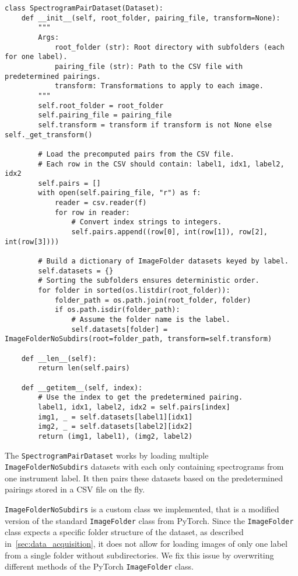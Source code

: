 \begin{lstlisting}[caption={Paired Dataset for Style Transfer}]
class SpectrogramPairDataset(Dataset):
    def __init__(self, root_folder, pairing_file, transform=None):
        """
        Args:
            root_folder (str): Root directory with subfolders (each for one label).
            pairing_file (str): Path to the CSV file with predetermined pairings.
            transform: Transformations to apply to each image.
        """
        self.root_folder = root_folder
        self.pairing_file = pairing_file
        self.transform = transform if transform is not None else self._get_transform()

        # Load the precomputed pairs from the CSV file.
        # Each row in the CSV should contain: label1, idx1, label2, idx2
        self.pairs = []
        with open(self.pairing_file, "r") as f:
            reader = csv.reader(f)
            for row in reader:
                # Convert index strings to integers.
                self.pairs.append((row[0], int(row[1]), row[2], int(row[3])))

        # Build a dictionary of ImageFolder datasets keyed by label.
        self.datasets = {}
        # Sorting the subfolders ensures deterministic order.
        for folder in sorted(os.listdir(root_folder)):
            folder_path = os.path.join(root_folder, folder)
            if os.path.isdir(folder_path):
                # Assume the folder name is the label.
                self.datasets[folder] = ImageFolderNoSubdirs(root=folder_path, transform=self.transform)

    def __len__(self):
        return len(self.pairs)

    def __getitem__(self, index):
        # Use the index to get the predetermined pairing.
        label1, idx1, label2, idx2 = self.pairs[index]
        img1, _ = self.datasets[label1][idx1]
        img2, _ = self.datasets[label2][idx2]
        return (img1, label1), (img2, label2)
\end{lstlisting}

The \texttt{SpectrogramPairDataset} works by loading multiple \\
\texttt{ImageFolderNoSubdirs} datasets with each only containing spectrograms from one instrument label.
It then pairs these datasets based on the predetermined pairings stored in a CSV file on the fly.

\texttt{ImageFolderNoSubdirs} is a custom class we implemented, that is a modified version of the standard \texttt{ImageFolder} class from PyTorch. 
Since the \texttt{ImageFolder} class expects a specific folder structure of the dataset, as described in~\ref{sec:data_acquisition}, it does not allow for loading images of only one label from a single folder without subdirectories.
We fix this issue by overwriting different methods of the PyTorch \texttt{ImageFolder} class.
\\\\



